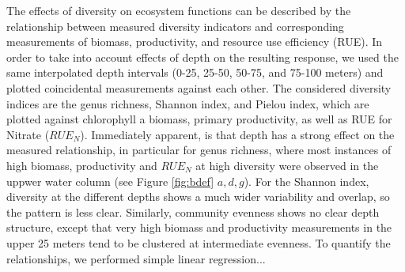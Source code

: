 \documentclass[draft]{agujournal2019}
\begin{document}
The effects of diversity on ecosystem functions can be described by the relationship between measured diversity indicators and corresponding measurements of biomass, productivity, and resource use efficiency (RUE). In order to take into account effects of depth on the resulting response, we used the same interpolated depth intervals (0-25, 25-50, 50-75, and 75-100 meters) and plotted coincidental measurements against each other. The considered diversity indices are the genus richness, Shannon index, and Pielou index, which are plotted against chlorophyll a biomass, primary productivity, as well as RUE for Nitrate ($RUE_N$). Immediately apparent, is that depth has a strong effect on the measured relationship, in particular for genus richness, where most instances of high biomass, productivity and $RUE_N$ at high diversity were observed in the uppwer water column (see Figure \ref{fig:bdef} $a, d, g$). For the Shannon index, diversity at the different depths shows a much wider variability and overlap, so the pattern is less clear.  Similarly, community evenness shows no clear depth structure, except that very high biomass and productivity measurements in the upper 25 meters tend to be clustered at intermediate evenness. 
To quantify the relationships, we performed simple linear regression... %
\end{document}
